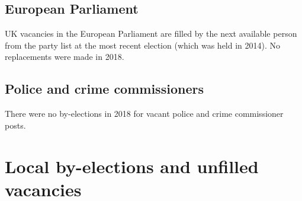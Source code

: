 \section{European Parliament}

UK vacancies in the European Parliament are filled by the next available person from the party list at the most recent election (which was held in 2014).
No replacements were made in 2018.

\section{Police and crime commissioners}

There were no by-elections in 2018 for vacant police and crime commissioner posts.

\chapter{Local by-elections and unfilled vacancies}

